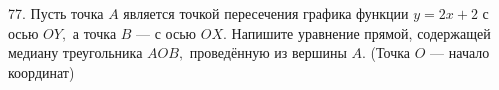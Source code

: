 77. Пусть точка $A$ является точкой пересечения графика функции $y=2x+2$ с осью $OY,$ а точка $B$ --- с осью $OX.$ Напишите уравнение прямой, содержащей медиану треугольника $AOB,$ проведённую из вершины $A.$ (Точка $O$ --- начало координат)\\
